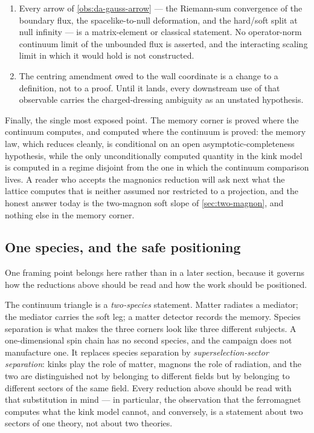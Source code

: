 \begin{enumerate}
      counting package may be called radiative memory in no sense at all.
\item Every arrow of \cref{obs:da-gauss-arrow} --- the Riemann-sum convergence
      of the boundary flux, the spacelike-to-null deformation, and the
      hard/soft split at null infinity --- is a matrix-element or classical
      statement. No operator-norm continuum limit of the unbounded flux is
      asserted, and the interacting scaling limit in which it would hold is not
      constructed.
\item The centring amendment owed to the wall coordinate is a change to a
      definition, not to a proof. Until it lands, every downstream use of that
      observable carries the charged-dressing ambiguity as an unstated
      hypothesis.
\end{enumerate}

\noindent Finally, the single most exposed point. The memory corner is proved
where the continuum computes, and computed where the continuum is proved: the
memory law, which reduces cleanly, is conditional on an open
asymptotic-completeness hypothesis, while the only unconditionally computed
quantity in the kink model is computed in a regime disjoint from the one in
which the continuum comparison lives. A reader who accepts the magnonics
reduction will ask next what the lattice computes that is neither assumed nor
restricted to a projection, and the honest answer today is the two-magnon soft
slope of \cref{sec:two-magnon}, and nothing else in the memory corner.

\subsection{One species, and the safe positioning}
\label{sec:red-one-species}

One framing point belongs here rather than in a later section, because it
governs how the reductions above should be read and how the work should be
positioned.

The continuum triangle is a \emph{two-species} statement. Matter radiates a
mediator; the mediator carries the soft leg; a matter detector records the
memory. Species separation is what makes the three corners look like three
different subjects. A one-dimensional spin chain has no second species, and the
campaign does not manufacture one. It replaces species separation by
\emph{superselection-sector separation}: kinks play the role of matter, magnons
the role of radiation, and the two are distinguished not by belonging to
different fields but by belonging to different sectors of the same field. Every
reduction above should be read with that substitution in mind --- in
particular, the observation that the ferromagnet computes what the kink model
cannot, and conversely, is a statement about two sectors of one theory, not
about two theories.

